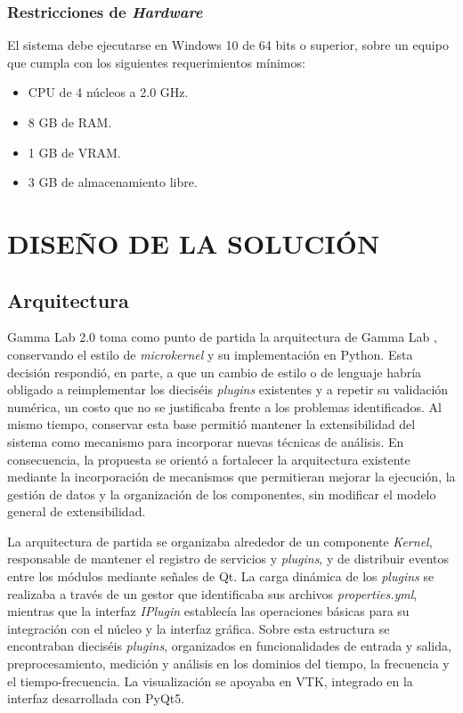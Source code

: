 \documentclass[12pt,letterpaper,oneside]{article}
\newcommand{\capitulo}[1]{\clearpage\section{#1}}
\begin{document}
\subsubsection{Restricciones de \textit{Hardware}}

El sistema debe ejecutarse en Windows 10 de 64 bits o superior, sobre un equipo que cumpla con los siguientes requerimientos mínimos:

\begin{itemize}
    \item CPU de 4 núcleos a 2.0 GHz.
    \item 8 GB de RAM.
    \item 1 GB de VRAM.
    \item 3 GB de almacenamiento libre.
\end{itemize}


\capitulo{DISEÑO DE LA SOLUCIÓN}

\subsection{Arquitectura}

Gamma Lab 2.0 toma como punto de partida la arquitectura de Gamma Lab \cite{asencio2025}, conservando el estilo de \textit{microkernel} y su implementación en Python. Esta decisión respondió, en parte, a que un cambio de estilo o de lenguaje habría obligado a reimplementar los dieciséis \textit{plugins} existentes y a repetir su validación numérica, un costo que no se justificaba frente a los problemas identificados. Al mismo tiempo, conservar esta base permitió mantener la extensibilidad del sistema como mecanismo para incorporar nuevas técnicas de análisis. En consecuencia, la propuesta se orientó a fortalecer la arquitectura existente mediante la incorporación de mecanismos que permitieran mejorar la ejecución, la gestión de datos y la organización de los componentes, sin modificar el modelo general de extensibilidad.

La arquitectura de partida se organizaba alrededor de un componente \textit{Kernel}, responsable de mantener el registro de servicios y \textit{plugins}, y de distribuir eventos entre los módulos mediante señales de Qt. La carga dinámica de los \textit{plugins} se realizaba a través de un gestor que identificaba sus archivos \textit{properties.yml}, mientras que la interfaz \textit{IPlugin} establecía las operaciones básicas para su integración con el núcleo y la interfaz gráfica. Sobre esta estructura se encontraban dieciséis \textit{plugins}, organizados en funcionalidades de entrada y salida, preprocesamiento, medición y análisis en los dominios del tiempo, la frecuencia y el tiempo-frecuencia. La visualización se apoyaba en VTK, integrado en la interfaz desarrollada con PyQt5.
\end{document}
